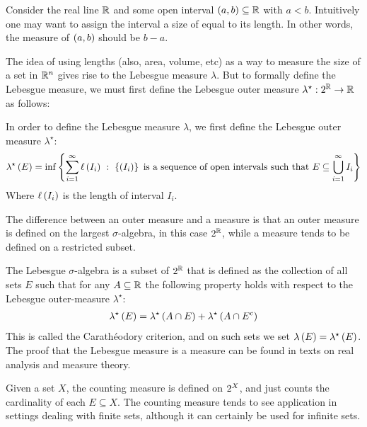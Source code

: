 \begin{example}
  Consider the real line \(\mathbb{R}\)
  and some open interval \(\left(a, b\right) \subseteq \mathbb{R}\) with \(a < b\).
  Intuitively one may want to assign the interval a size of
  equal to its length.
  In other words, the measure of \(\left(a, b\right)\) should be \(b - a\).

  The idea of using lengths (also, area, volume, etc) as a way to measure
  the size of a set in \(\mathbb{R}^n\) gives rise to the Lebesgue measure
  \(\lambda\).
  But to formally define the Lebesgue measure, we must first
  define the Lebesgue outer measure
  \(\lambda^\star : 2^{\mathbb{R}} \to \mathbb{R}\) as follows:
  
  In order to define the Lebesgue measure \(\lambda\),
  we first define the Lebesgue outer measure \(\lambda^\star\):
  \begin{align*}
    \lambda^\star \parens{E}
      = \inf\braces{\sum_{i = 1}^{\infty} \ell\parens{I_i} \st
                      \braces{\parens{I_i}}
                      \ \text{is a sequence of open intervals such that} \ 
                      E \subseteq \bigcup_{i = 1}^{\infty} {I_i}}
  \end{align*}
  Where \(\ell\left(I_i\right)\) is the length of interval \(I_i\).

  The difference between an outer measure and a measure is that
  an outer measure is defined on the largest \(\sigma\)-algebra,
  in this case \(2^{\mathbb{R}}\),
  while a measure tends to be defined on a restricted subset.

  The Lebesgue \(\sigma\)-algebra is a subset of \(2^{\mathbb{R}}\) that
  is defined as the collection of all sets \(E\) such that
  for any \(A \subseteq \mathbb{R}\) the following property holds with respect
  to the Lebesgue outer-measure \(\lambda^\star\):
  \begin{align*}
    \lambda^\star \left(E\right)
      = \lambda^\star \left(A \cap E\right) + \lambda^\star \left(A \cap E^c\right)
  \end{align*}
  This is called the Carath{\'e}odory criterion,
  and on such sets we set \(\lambda\left(E\right) = \lambda^\star \left(E\right)\).
  The proof that the Lebesgue measure is a measure can be found
  in texts on real analysis and measure theory.

\end{example}



\begin{example}
  Given a set \(X\),
  the counting measure is defined on \(2^{X}\),
  and just counts the cardinality of each \(E \subseteq X\).
  The counting measure tends to see application in settings
  dealing with finite sets,
  although it can certainly be used for infinite sets.
\end{example}

